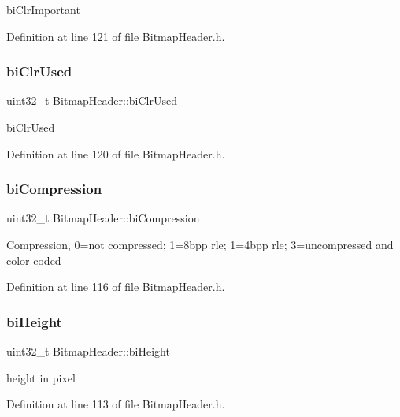 bi\+Clr\+Important 

Definition at line 121 of file Bitmap\+Header.\+h.

\mbox{\label{classBitmapHeader_a621822a0df6f18b2f5f6bbebed1de028}} 
\subsubsection{\texorpdfstring{biClrUsed}{biClrUsed}}
{\footnotesize\ttfamily uint32\+\_\+t Bitmap\+Header\+::bi\+Clr\+Used\hspace{0.3cm}{\ttfamily [private]}}

bi\+Clr\+Used 

Definition at line 120 of file Bitmap\+Header.\+h.

\mbox{\label{classBitmapHeader_a07680e0e463506764ac69707bc51900c}} 
\subsubsection{\texorpdfstring{biCompression}{biCompression}}
{\footnotesize\ttfamily uint32\+\_\+t Bitmap\+Header\+::bi\+Compression\hspace{0.3cm}{\ttfamily [private]}}

Compression, 0=not compressed; 1=8bpp rle; 1=4bpp rle; 3=uncompressed and color coded 

Definition at line 116 of file Bitmap\+Header.\+h.

\mbox{\label{classBitmapHeader_a76091025a4295933d3127ae41c6e6611}} 
\subsubsection{\texorpdfstring{biHeight}{biHeight}}
{\footnotesize\ttfamily uint32\+\_\+t Bitmap\+Header\+::bi\+Height\hspace{0.3cm}{\ttfamily [private]}}

height in pixel 

Definition at line 113 of file Bitmap\+Header.\+h.

